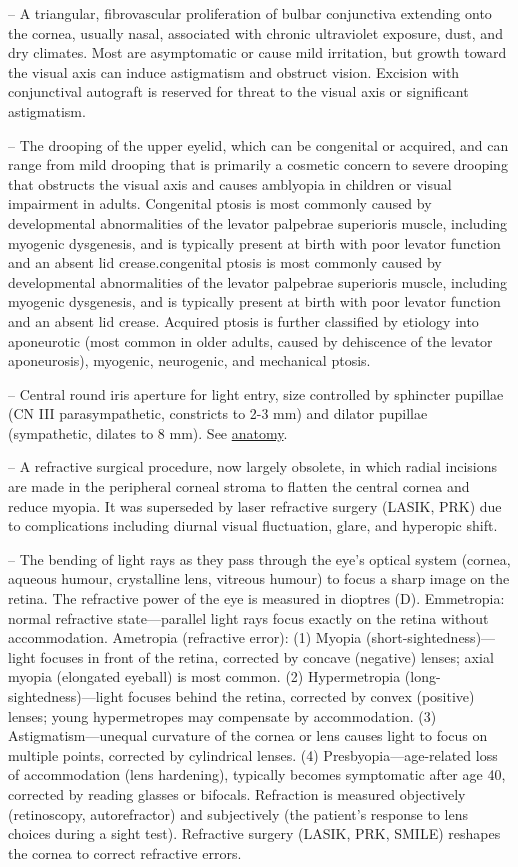 -- A triangular, fibrovascular proliferation of bulbar conjunctiva extending onto the cornea, usually nasal, associated with chronic ultraviolet exposure, dust, and dry climates. Most are asymptomatic or cause mild irritation, but growth toward the visual axis can induce astigmatism and obstruct vision. Excision with conjunctival autograft is reserved for threat to the visual axis or significant astigmatism.

-- The drooping of the upper eyelid, which can be congenital or acquired, and can range from mild drooping that is primarily a cosmetic concern to severe drooping that obstructs the visual axis and causes amblyopia in children or visual impairment in adults. Congenital ptosis is most commonly caused by developmental abnormalities of the levator palpebrae superioris muscle, including myogenic dysgenesis, and is typically present at birth with poor levator function and an absent lid crease.congenital ptosis is most commonly caused by developmental abnormalities of the levator palpebrae superioris muscle, including myogenic dysgenesis, and is typically present at birth with poor levator function and an absent lid crease. Acquired ptosis is further classified by etiology into aponeurotic (most common in older adults, caused by dehiscence of the levator aponeurosis), myogenic, neurogenic, and mechanical ptosis.

-- Central round iris aperture for light entry, size controlled by sphincter pupillae (CN III parasympathetic, constricts to 2-3 mm) and dilator pupillae (sympathetic, dilates to 8 mm). See \hyperlink{Anatomy}{anatomy}.

-- A refractive surgical procedure, now largely obsolete, in which radial incisions are made in the peripheral corneal stroma to flatten the central cornea and reduce myopia. It was superseded by laser refractive surgery (LASIK, PRK) due to complications including diurnal visual fluctuation, glare, and hyperopic shift.


-- The bending of light rays as they pass through the eye's optical system (cornea, aqueous humour, crystalline lens, vitreous humour) to focus a sharp image on the retina. The refractive power of the eye is measured in dioptres (D). Emmetropia: normal refractive state—parallel light rays focus exactly on the retina without accommodation. Ametropia (refractive error): (1) Myopia (short-sightedness)—light focuses in front of the retina, corrected by concave (negative) lenses; axial myopia (elongated eyeball) is most common. (2) Hypermetropia (long-sightedness)—light focuses behind the retina, corrected by convex (positive) lenses; young hypermetropes may compensate by accommodation. (3) Astigmatism—unequal curvature of the cornea or lens causes light to focus on multiple points, corrected by cylindrical lenses. (4) Presbyopia—age-related loss of accommodation (lens hardening), typically becomes symptomatic after age 40, corrected by reading glasses or bifocals. Refraction is measured objectively (retinoscopy, autorefractor) and subjectively (the patient's response to lens choices during a sight test). Refractive surgery (LASIK, PRK, SMILE) reshapes the cornea to correct refractive errors.

